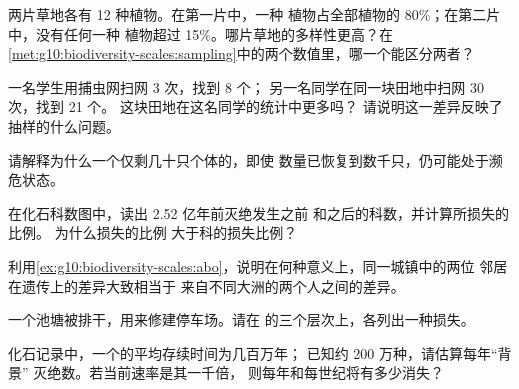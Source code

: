 \begin{exercise}[$\star\star$]\label{exo:g10:biodiversity-scales:6}
两片草地各有 12 种植物。在第一片中，一种
植物占全部植物的 80\%；在第二片中，没有任何一种
植物超过 15\%。哪片草地的多样性更高？在
\cref{met:g10:biodiversity-scales:sampling}中的两个数值里，哪一个能区分两者？
\end{exercise}

\begin{exercise}[$\star\star$]\label{exo:g10:biodiversity-scales:7}
一名学生用捕虫网扫网 3 次，找到 8 个；
另一名同学在同一块田地中扫网 30 次，找到 21 个。
这块田地在这名同学的统计中更多吗？
请说明这一差异反映了抽样的什么问题。
\end{exercise}

\begin{exercise}[$\star\star$]\label{exo:g10:biodiversity-scales:8}
请解释为什么一个仅剩几十只个体的，即使
数量已恢复到数千只，仍可能处于濒危状态。
\end{exercise}

\begin{exercise}[$\star\star$]\label{exo:g10:biodiversity-scales:9}
在化石科数图中，读出 2.52 亿年前灭绝发生之前
和之后的科数，并计算所损失的比例。
为什么\emph{}损失的比例
大于科的损失比例？
\end{exercise}

\begin{exercise}[$\star\star$]\label{exo:g10:biodiversity-scales:10}
利用\cref{ex:g10:biodiversity-scales:abo}，说明在何种意义上，同一城镇中的两位
邻居在遗传上的差异大致相当于
来自不同大洲的两个人之间的差异。
\end{exercise}

\begin{exercise}[$\star\star$]\label{exo:g10:biodiversity-scales:11}
一个池塘被排干，用来修建停车场。请在
的三个层次上，各列出一种损失。
\end{exercise}

\begin{exercise}[$\star\star\star$]\label{exo:g10:biodiversity-scales:12}
化石记录中，一个的平均存续时间为几百万年；
已知约 200 万种，请估算每年“背景”
灭绝数。若当前速率是其一千倍，
则每年和每世纪将有多少消失？
\end{exercise}

